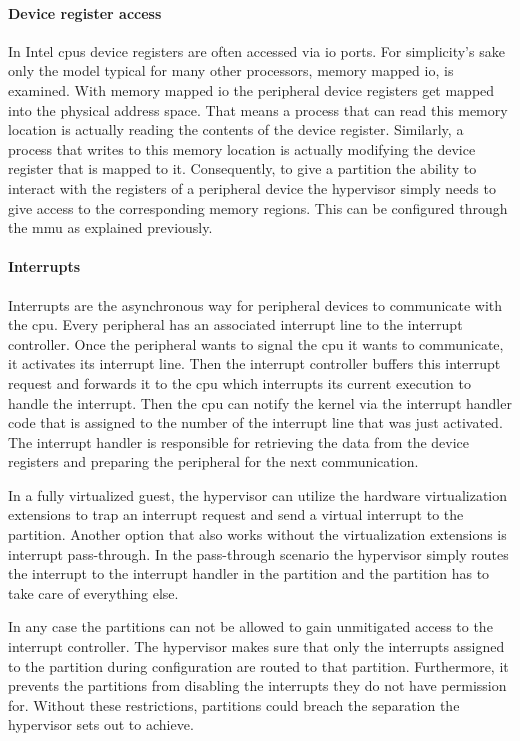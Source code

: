 \paragraph{Device register access}
In Intel \acrshort{cpu}s device registers are often accessed via \acrshort{io} ports. For simplicity's sake only the model typical for many other processors, memory mapped \acrshort{io}, is examined. With memory mapped \acrshort{io} the peripheral device registers get mapped into the physical address space. That means a process that can read this memory location is actually reading the contents of the device register. Similarly, a process that writes to this memory location is actually modifying the device register that is mapped to it. Consequently, to give a partition the ability to interact with the registers of a peripheral device the hypervisor simply needs to give access to the corresponding memory regions. This can be configured through the \acrshort{mmu} as explained previously.

\paragraph{Interrupts}
Interrupts are the asynchronous way for peripheral devices to communicate with the \acrshort{cpu}. Every peripheral has an associated interrupt line to the interrupt controller. Once the peripheral wants to signal the \acrshort{cpu} it wants to communicate, it activates its interrupt line. Then the interrupt controller buffers this interrupt request and forwards it to the \acrshort{cpu} which interrupts its current execution to handle the interrupt. Then the \acrshort{cpu} can notify the kernel via the interrupt handler code that is assigned to the number of the interrupt line that was just activated. The interrupt handler is responsible for retrieving the data from the device registers and preparing the peripheral for the next communication.

In a fully virtualized guest, the hypervisor can utilize the hardware virtualization extensions to trap an interrupt request and send a virtual interrupt to the partition. Another option that also works without the virtualization extensions is interrupt pass-through. In the pass-through scenario the hypervisor simply routes the interrupt to the interrupt handler in the partition and the partition has to take care of everything else.

In any case the partitions can not be allowed to gain unmitigated access to the interrupt controller. The hypervisor makes sure that only the interrupts assigned to the partition during configuration are routed to that partition. Furthermore, it prevents the partitions from disabling the interrupts they do not have permission for. Without these restrictions, partitions could breach the separation the hypervisor sets out to achieve.

